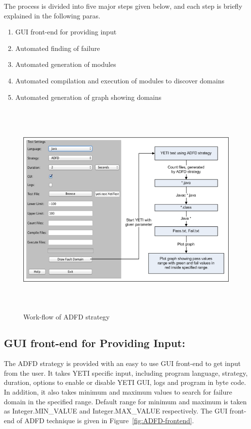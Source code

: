 The process is divided into five major steps given below, and each step is briefly explained in the following paras.

\begin{enumerate}
\item GUI front-end for providing input
\item Automated finding of failure
\item Automated generation of modules
\item Automated compilation and execution of modules to discover domains
\item Automated generation of graph showing domains
\end{enumerate}

\bigskip
\begin{figure}[ht]
\centering
\includegraphics[width=15cm,height=11cm]{chapter5/ADFD_Diagram1.png}
\bigskip
\caption{Work-flow of ADFD strategy}
\label{fig:ADFD-workflow}
\end{figure}
\bigskip

\subsection{GUI front-end for Providing Input:}
The ADFD strategy is provided with an easy to use GUI front-end to get input from the user. It takes YETI specific input, including program language, strategy, duration, options to enable or disable YETI GUI, logs and program in byte code. In addition, it also takes minimum and maximum values to search for failure domain in the specified range. Default range for minimum and maximum is taken as Integer.MIN\_VALUE and Integer.MAX\_VALUE respectively. The GUI front-end of ADFD technique is given in Figure~\ref{fig:ADFD-frontend}.


